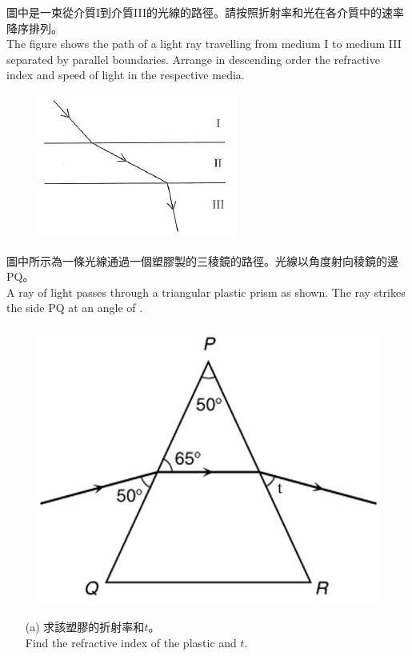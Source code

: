 \documentclass[beamer=true]{standalone}
\begin{document}
\begin{eg}
圖中是一束從介質I到介質III的光線的路徑。請按照折射率和光在各介質中的速率降序排列。\\The figure shows the path of a light ray travelling from medium I to medium III separated by parallel boundaries. Arrange in descending order the refractive index and speed of light in the respective media.
    \begin{figure}
        \centering
        \includegraphics[width=0.5\linewidth]{assets/8eu89c2n28.png}
    \end{figure}
\end{eg}


\begin{eg}
    圖中所示為一條光線通過一個塑膠製的三稜鏡的路徑。光線以角度射向稜鏡的邊PQ。\\A ray of light passes through a triangular plastic prism as shown. The ray strikes the side PQ at an angle of .
    \begin{figure}
        \centering
        \includegraphics[width=0.5\linewidth]{assets/9209138209312.png}
        
        
    \end{figure}
    
\end{eg}

\begin{eg}
    \begin{itemize}
        \item [(a)] 求該塑膠的折射率和$t$。\\Find the refractive index of the plastic and $t$.
    \end{itemize}
\end{eg}
\end{document}
